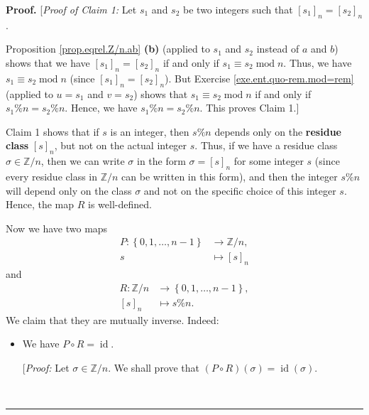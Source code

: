 \documentclass[numbers=enddot,12pt,final,onecolumn,notitlepage]{scrartcl}%
\numberwithin{exer}{subsection}
\theoremstyle{definition}
\newenvironment{proof}[1][Proof]{\noindent\textbf{#1.} }{\ \rule{0.5em}{0.5em}}
\begin{document}
\begin{proof}
[\textit{Proof of Claim 1:} Let $s_{1}$ and $s_{2}$ be two integers such that
$\left[  s_{1}\right]  _{n}=\left[  s_{2}\right]  _{n}$.

Proposition \ref{prop.eqrel.Z/n.ab} \textbf{(b)} (applied to $s_{1}$ and
$s_{2}$ instead of $a$ and $b$) shows that we have $\left[  s_{1}\right]
_{n}=\left[  s_{2}\right]  _{n}$ if and only if $s_{1}\equiv s_{2}%
\operatorname{mod}n$. Thus, we have $s_{1}\equiv s_{2}\operatorname{mod}n$
(since $\left[  s_{1}\right]  _{n}=\left[  s_{2}\right]  _{n}$). But Exercise
\ref{exe.ent.quo-rem.mod=rem} (applied to $u=s_{1}$ and $v=s_{2}$) shows that
$s_{1}\equiv s_{2}\operatorname{mod}n$ if and only if $s_{1}\%n=s_{2}\%n$.
Hence, we have $s_{1}\%n=s_{2}\%n$. This proves Claim 1.]

Claim 1 shows that if $s$ is an integer, then $s\%n$ depends only on the
\textbf{residue class} $\left[  s\right]  _{n}$, but not on the actual integer
$s$. Thus, if we have a residue class $\sigma\in\mathbb{Z}/n$, then we can
write $\sigma$ in the form $\sigma=\left[  s\right]  _{n}$ for some integer
$s$ (since every residue class in $\mathbb{Z}/n$ can be written in this form),
and then the integer $s\%n$ will depend only on the class $\sigma$ and not on
the specific choice of this integer $s$. Hence, the map $R$ is well-defined.

Now we have two maps%
\begin{align*}
P:\left\{  0,1,\ldots,n-1\right\}   &  \rightarrow\mathbb{Z}/n,\\
s  &  \mapsto\left[  s\right]  _{n}%
\end{align*}
and%
\begin{align*}
R:\mathbb{Z}/n  &  \rightarrow\left\{  0,1,\ldots,n-1\right\}  ,\\
\left[  s\right]  _{n}  &  \mapsto s\%n.
\end{align*}
We claim that they are mutually inverse. Indeed:

\begin{itemize}
\item We have $P\circ R=\operatorname*{id}$.

[\textit{Proof:} Let $\sigma\in\mathbb{Z}/n$. We shall prove that $\left(
P\circ R\right)  \left(  \sigma\right)  =\operatorname*{id}\left(
\sigma\right)  $.


\end{itemize}
\end{proof}
\end{document}
